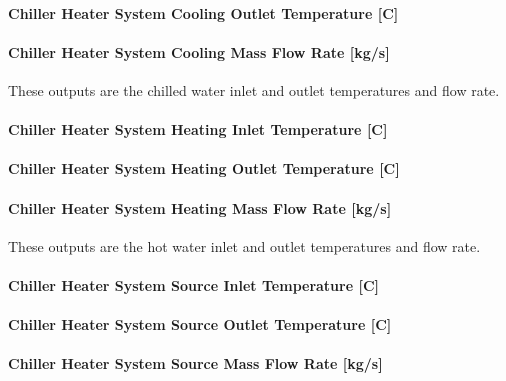\paragraph{Chiller Heater System Cooling Outlet Temperature {[}C{]}}\label{chiller-heater-system-cooling-outlet-temperature-c}

\paragraph{Chiller Heater System Cooling Mass Flow Rate {[}kg/s{]}}\label{chiller-heater-system-cooling-mass-flow-rate-kgs}

These outputs are the chilled water inlet and outlet temperatures and flow rate.

\paragraph{Chiller Heater System Heating Inlet Temperature {[}C{]}}\label{chiller-heater-system-heating-inlet-temperature-c}

\paragraph{Chiller Heater System Heating Outlet Temperature {[}C{]}}\label{chiller-heater-system-heating-outlet-temperature-c}

\paragraph{Chiller Heater System Heating Mass Flow Rate {[}kg/s{]}}\label{chiller-heater-system-heating-mass-flow-rate-kgs}

These outputs are the hot water inlet and outlet temperatures and flow rate.

\paragraph{Chiller Heater System Source Inlet Temperature {[}C{]}}\label{chiller-heater-system-source-inlet-temperature-c}

\paragraph{Chiller Heater System Source Outlet Temperature {[}C{]}}\label{chiller-heater-system-source-outlet-temperature-c}

\paragraph{Chiller Heater System Source Mass Flow Rate {[}kg/s{]}}\label{chiller-heater-system-source-mass-flow-rate-kgs}

